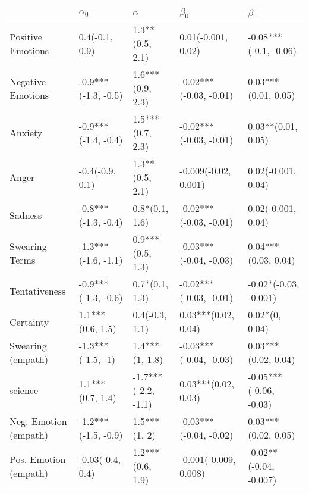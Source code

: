 \begin{tabular}{lllll}
\toprule
{} &           $\alpha_0$ &             $\alpha$ &               $\beta_0$ &                 $\beta$ \\
\midrule
Positive Emotions     &       0.4(-0.1, 0.9) &      1.3**(0.5, 2.1) &      0.01(-0.001, 0.02) &   -0.08***(-0.1, -0.06) \\
Negative Emotions     &  -0.9***(-1.3, -0.5) &     1.6***(0.9, 2.3) &  -0.02***(-0.03, -0.01) &     0.03***(0.01, 0.05) \\
Anxiety               &  -0.9***(-1.4, -0.4) &     1.5***(0.7, 2.3) &  -0.02***(-0.03, -0.01) &      0.03**(0.01, 0.05) \\
Anger                 &      -0.4(-0.9, 0.1) &      1.3**(0.5, 2.1) &    -0.009(-0.02, 0.001) &      0.02(-0.001, 0.04) \\
Sadness               &  -0.8***(-1.3, -0.4) &       0.8*(0.1, 1.6) &  -0.02***(-0.03, -0.01) &      0.02(-0.001, 0.04) \\
Swearing Terms        &  -1.3***(-1.6, -1.1) &     0.9***(0.5, 1.3) &  -0.03***(-0.04, -0.03) &     0.04***(0.03, 0.04) \\
Tentativeness         &  -0.9***(-1.3, -0.6) &       0.7*(0.1, 1.3) &  -0.02***(-0.03, -0.01) &   -0.02*(-0.03, -0.001) \\
Certainty             &     1.1***(0.6, 1.5) &       0.4(-0.3, 1.1) &     0.03***(0.02, 0.04) &          0.02*(0, 0.04) \\
Swearing (empath)     &    -1.3***(-1.5, -1) &       1.4***(1, 1.8) &  -0.03***(-0.04, -0.03) &     0.03***(0.02, 0.04) \\
science               &     1.1***(0.7, 1.4) &  -1.7***(-2.2, -1.1) &     0.03***(0.02, 0.03) &  -0.05***(-0.06, -0.03) \\
Neg. Emotion (empath) &  -1.2***(-1.5, -0.9) &         1.5***(1, 2) &  -0.03***(-0.04, -0.02) &     0.03***(0.02, 0.05) \\
Pos. Emotion (empath) &     -0.03(-0.4, 0.4) &     1.2***(0.6, 1.9) &   -0.001(-0.009, 0.008) &  -0.02**(-0.04, -0.007) \\
\bottomrule
\end{tabular}
